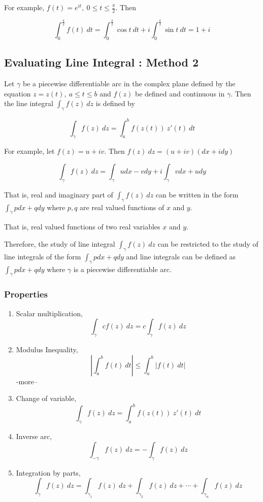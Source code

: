 	For example, $f(t) = e^{it},\ 0 \le t \le \frac{\pi}{2}$.
	Then 

\[ \int_0^{\frac{\pi}{2}} f(t)\ dt = \int_0^{\frac{\pi}{2}} \cos t\ dt + i \int_0^{\frac{\pi}{2}} \sin t\ dt = 1 + i \]

\subsection{Evaluating Line Integral : Method 2}
	Let $\gamma$ be a piecewise differentiable arc in the complex plane defined by the equation $z = z(t),\ a \le t \le b$ and $f(z)$ be defined and continuous in $\gamma$.
	Then the line integral $\int_\gamma f(z)\ dz$ is defined by

\[ \int_\gamma f(z)\ dz = \int_a^b f(z(t))\ z'(t)\ dt \]

	For example, let $f(z) = u+iv$.
	Then $f(z)\ dz = (u+iv)(dx+idy)$

\[ \int_\gamma f(z)\ dz = \int_\gamma udx - vdy + i \int_\gamma vdx + udy \]

	That is, real and imaginary part of $\int_\gamma f(z)\ dz$ can be written in the form $\int_\gamma pdx + qdy$ where $p,q$ are real valued functions of $x$ and $y$.
\begin{commentary}
	That is, real valued functions of two real variables $x$ and $y$.
\end{commentary}
	Therefore, the study of line integral $\int_\gamma f(z)\ dz$ can be restricted to the study of line integrals of the form $\int_\gamma pdx+qdy$ and line integrals can be defined as $\int_\gamma pdx+qdy$ where $\gamma$ is a piecewise differentiable arc.
\subsubsection{Properties}
\begin{enumerate}
	\item Scalar multiplication,
		\[ \int_\gamma cf(z)\ dz = c\int_\gamma f(z)\ dz \]
	\item Modulus Inequality,
		\[ \left| \int_a^b f(t)\ dt \right| \le \int_a^b |f(t)\ dt| \] -more--
	\item Change of variable,
		\[ \int_\gamma f(z)\ dz = \int_a^b f(z(t))\ z'(t)\ dt \]
	\item Inverse arc,
		\[ \int_{-\gamma} f(z)\ dz = -\int_\gamma f(z)\ dz \]
	\item Integration by parts,
		\[ \int_\gamma f(z)\ dz = \int_{\gamma_1} f(z)\ dz + \int_{\gamma_2} f(z)\ dz+ \cdots + \int_{\gamma_n} f(z)\ dz \]
\end{enumerate}

